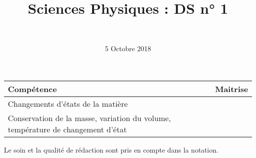 \documentclass[a4paper,11pt]{exam}
\author{\ }
\date{5 Octobre 2018}
\title{Sciences Physiques : DS n° 1}
\begin{document}
%	

	\maketitle
	
\begin{small}
	\begin{center}
		\begin{tabular}{|@{\ }l@{}|@{\ }c@{\ }|}
			\hline
			\textbf{Compétence} & \textbf{Maitrise} \\
			\hline
			Changements d’états de la matière \ &  \ \ \ \\
			\hline
			Conservation de la masse, variation du volume, température de changement d’état \ &  \ \ \ \\
			\hline
		\end{tabular}
	\end{center}
\end{small}	
	
	

%

%

Le soin et la qualité de rédaction sont pris en compte dans la notation.


%







%




 





\ \label{LastPage}
\end{document}
